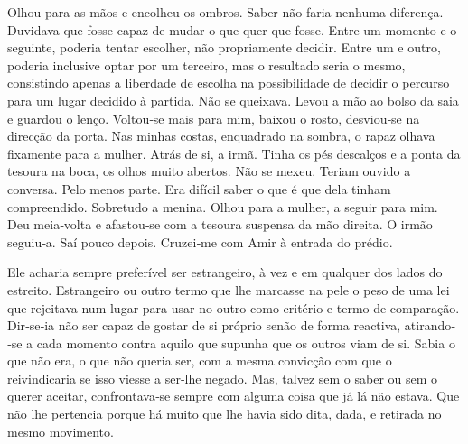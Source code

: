 Olhou para as mãos e encolheu os ombros. Saber não faria nenhuma
diferença. Duvidava que fosse capaz de mudar o que quer que fosse. Entre
um momento e o seguinte, poderia tentar escolher, não propriamente
decidir. Entre um e outro, poderia inclusive optar por um terceiro, mas
o resultado seria o mesmo, consistindo apenas a liberdade de escolha na
possibilidade de decidir o percurso para um lugar decidido à partida.
Não se queixava. Levou a mão ao bolso da saia e guardou o lenço.
Voltou­‑se mais para mim, baixou o rosto, desviou­‑se na direcção da
porta. Nas minhas costas, enquadrado na sombra, o rapaz olhava fixamente
para a mulher. Atrás de si, a irmã. Tinha os pés descalços e a ponta da
tesoura na boca, os olhos muito abertos. Não se mexeu. Teriam ouvido a
conversa. Pelo menos parte. Era difícil saber o que é que dela tinham
compreendido. Sobretudo a menina. Olhou para a mulher, a seguir para
mim. Deu meia­‑volta e afastou­‑se com a tesoura suspensa da mão
direita. O irmão seguiu­‑a. Saí pouco depois. Cruzei­‑me com Amir à
entrada do prédio.

Ele acharia sempre preferível ser estrangeiro, à vez e em qualquer dos
lados do estreito. Estrangeiro ou outro termo que lhe marcasse na pele o
peso de uma lei que rejeitava num lugar para usar no outro como critério
e termo de comparação. Dir­‑se­‑ia não ser capaz de gostar de si próprio
senão de forma reactiva, atirando­‑se a cada momento contra aquilo que
supunha que os outros viam de si. Sabia o que não era, o que não queria
ser, com a mesma convicção com que o reivindicaria se isso viesse a
ser­‑lhe negado. Mas, talvez sem o saber ou sem o querer aceitar,
confrontava­‑se sempre com alguma coisa que já lá não estava. Que não
lhe pertencia porque há muito que lhe havia sido dita, dada, e retirada
no mesmo movimento.

